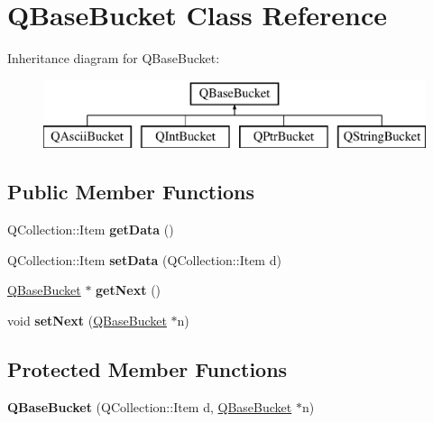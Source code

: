 \hypertarget{class_q_base_bucket}{}\section{Q\+Base\+Bucket Class Reference}
\label{class_q_base_bucket}
Inheritance diagram for Q\+Base\+Bucket\+:\begin{figure}[H]
\begin{center}
\leavevmode
\includegraphics[height=2.000000cm]{class_q_base_bucket}
\end{center}
\end{figure}
\subsection*{Public Member Functions}
\begin{DoxyCompactItemize}
\item 
\mbox{\label{class_q_base_bucket_a4a1bd6dbabde86a139c0c3762d460903}} 
Q\+Collection\+::\+Item {\bfseries get\+Data} ()
\item 
\mbox{\label{class_q_base_bucket_ae8fbd57c08046446acef5b7cc545637c}} 
Q\+Collection\+::\+Item {\bfseries set\+Data} (Q\+Collection\+::\+Item d)
\item 
\mbox{\label{class_q_base_bucket_abb5cadafab13c807edebf2c856883a22}} 
\mbox{\hyperlink{class_q_base_bucket}{Q\+Base\+Bucket}} $\ast$ {\bfseries get\+Next} ()
\item 
\mbox{\label{class_q_base_bucket_a08ad877af89ea4f2ecfaf116d18e713f}} 
void {\bfseries set\+Next} (\mbox{\hyperlink{class_q_base_bucket}{Q\+Base\+Bucket}} $\ast$n)
\end{DoxyCompactItemize}
\subsection*{Protected Member Functions}
\begin{DoxyCompactItemize}
\item 
\mbox{\label{class_q_base_bucket_a06197e38e74637c4baf78a31cd778ca9}} 
{\bfseries Q\+Base\+Bucket} (Q\+Collection\+::\+Item d, \mbox{\hyperlink{class_q_base_bucket}{Q\+Base\+Bucket}} $\ast$n)
\end{DoxyCompactItemize}
